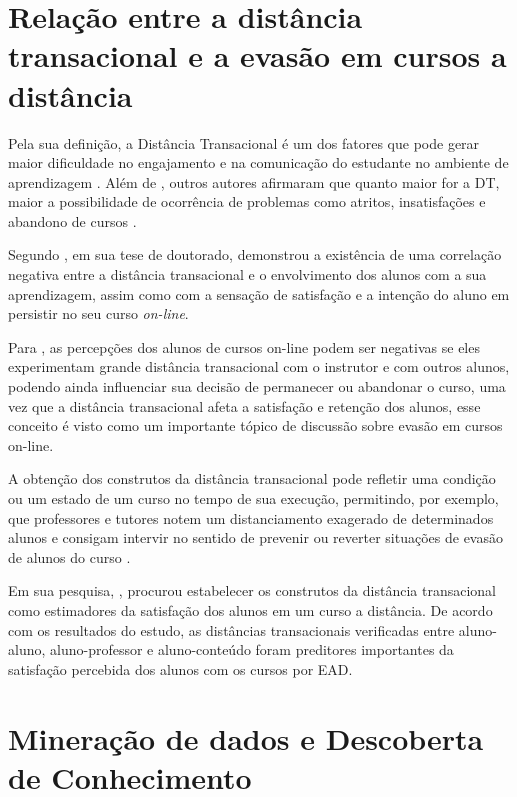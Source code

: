 \section{Relação entre a distância transacional e a evasão em cursos a distância}

Pela sua definição, a Distância Transacional é um dos fatores que pode gerar
maior dificuldade no engajamento e na comunicação do estudante no ambiente de
aprendizagem \cite{goel2012transactional}. Além de ,
outros autores afirmaram que quanto maior for a DT, maior a possibilidade de
ocorrência de problemas como atritos, insatisfações e abandono de cursos
\cite{zhang2003transactional,steinman2007educational,horzum2011developing,
mbwesa2014transactional,paul2015revisiting}.

Segundo , em sua tese de doutorado,
demonstrou a existência de uma correlação negativa entre a distância
transacional e o envolvimento dos alunos com a sua aprendizagem, assim como com
a sensação de satisfação e a intenção do aluno em persistir no seu curso
\textit{on-line}.

Para , as percepções dos alunos de cursos
on-line podem ser negativas se eles experimentam grande distância transacional
com o instrutor e com outros alunos, podendo ainda influenciar sua decisão de
permanecer ou abandonar o curso, uma vez que a distância transacional afeta a
satisfação e retenção dos alunos, esse conceito é visto como um importante
tópico de discussão sobre evasão em cursos on-line.

A obtenção dos construtos da distância transacional pode refletir uma condição
ou um estado de um curso no tempo de sua execução, permitindo, por exemplo, que
professores e tutores notem um distanciamento exagerado de determinados alunos e
consigam intervir no sentido de prevenir ou reverter situações de evasão de
alunos do curso \cite{horzum2011developing}.

Em sua pesquisa, , procurou estabelecer os
construtos da distância transacional como estimadores da satisfação dos alunos
em um curso a distância. De acordo com os resultados do estudo, as distâncias
transacionais verificadas entre aluno-aluno, aluno-professor e aluno-conteúdo
foram preditores importantes da satisfação percebida dos alunos com os cursos
por EAD.

\section{Mineração de dados e Descoberta de Conhecimento}

